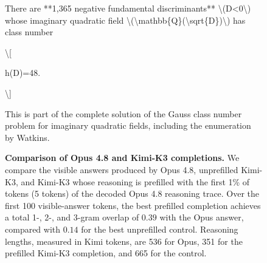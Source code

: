 \begin{figure}[t]
\begin{answercol}[equal height group=ansX2]
  \caret{}\par\vspace{4pt}
  \raggedright There are **1,365 negative fundamental discriminants** \textbackslash{}(D<0\textbackslash{}) whose imaginary quadratic field \textbackslash{}(\textbackslash{}mathbb\{Q\}(\textbackslash{}sqrt\{D\})\textbackslash{}) has class number\par\vspace{2pt}
  \textbackslash{}[\par\vspace{2pt}
  h(D)=48.\par\vspace{2pt}
  \textbackslash{}]\par\vspace{2pt}
  This is part of the complete solution of the Gauss class number problem for imaginary quadratic fields, including the enumeration by Watkins.\par\vspace{3pt}\elide
\end{answercol}
\caption{\textbf{Comparison of Opus 4.8 and Kimi-K3 completions.} We compare
the visible answers produced by Opus 4.8, unprefilled Kimi-K3, and Kimi-K3
whose reasoning is prefilled with the first 1\% of tokens (5 tokens) of the decoded
Opus 4.8 reasoning trace. Over the first 100 visible-answer tokens, the best
prefilled completion achieves a total 1-, 2-, and 3-gram overlap of $0.39$
with the Opus answer, compared with $0.14$ for the best unprefilled
control. Reasoning lengths, measured in Kimi tokens, are 536 for Opus,
351 for the prefilled Kimi-K3 completion, and 665 for the control.}
\label{fig:exhibit_X2}
\end{figure}


